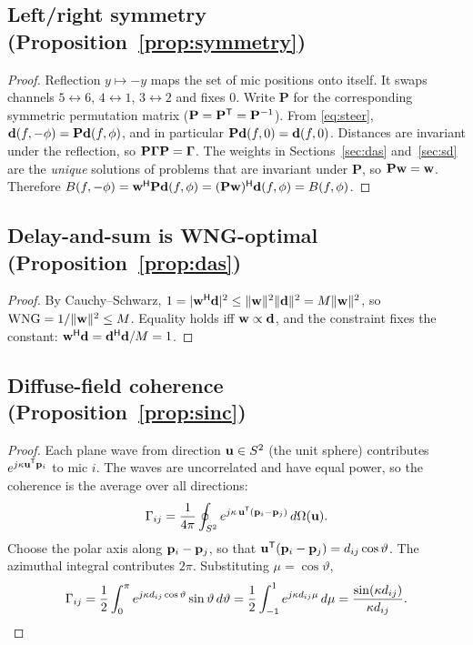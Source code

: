\documentclass[11pt]{article}
\begin{document}
\subsection{Left/right symmetry (Proposition~\ref{prop:symmetry})}\label{prf:symmetry}
\begin{proof}
Reflection $y\mapsto -y$ maps the set of mic positions onto itself. It swaps channels
$5\leftrightarrow6$, $4\leftrightarrow1$, $3\leftrightarrow2$ and fixes $0$. Write $\mathbf P$
for the corresponding symmetric permutation matrix ($\mathbf P=\mathbf P^{\mathsf T}=\mathbf P^{-1}$).
From \eqref{eq:steer}, $\mathbf{d}(f,-\phi)=\mathbf P\mathbf{d}(f,\phi)$, and in particular
$\mathbf P\mathbf{d}(f,0)=\mathbf{d}(f,0)$. Distances are invariant under the reflection, so
$\mathbf P\bm{\Gamma}\mathbf P=\bm{\Gamma}$. The weights in Sections~\ref{sec:das} and~\ref{sec:sd} are the
\emph{unique} solutions of problems that are invariant under $\mathbf P$, so $\mathbf P\mathbf{w}=\mathbf{w}$.
Therefore $B(f,-\phi)=\mathbf{w}^{\mathsf H}\mathbf P\mathbf{d}(f,\phi)=(\mathbf P\mathbf{w})^{\mathsf H}\mathbf{d}(f,\phi)=B(f,\phi)$.
\end{proof}

\subsection{Delay-and-sum is WNG-optimal (Proposition~\ref{prop:das})}\label{prf:das}
\begin{proof}
By Cauchy--Schwarz, $1=|\mathbf{w}^{\mathsf H}\mathbf{d}|^2\le\|\mathbf{w}\|^2\|\mathbf{d}\|^2=M\|\mathbf{w}\|^2$, so
$\mathrm{WNG}=1/\|\mathbf{w}\|^2\le M$. Equality holds iff $\mathbf{w}\propto\mathbf{d}$, and the constraint fixes the
constant: $\mathbf{w}^{\mathsf H}\mathbf{d}=\mathbf{d}^{\mathsf H}\mathbf{d}/M=1$.
\end{proof}

\subsection{Diffuse-field coherence (Proposition~\ref{prop:sinc})}\label{prf:sinc}
\begin{proof}
Each plane wave from direction $\mathbf{u}\in S^2$ (the unit sphere) contributes $e^{j\kappa\mathbf{u}^{\mathsf T}\mathbf{p}_i}$
to mic $i$. The waves are uncorrelated and have equal power, so the coherence is the average over
all directions:
\[
  \Gamma_{ij}=\frac{1}{4\pi}\oint_{S^2}e^{j\kappa\,\mathbf{u}^{\mathsf T}(\mathbf{p}_i-\mathbf{p}_j)}\,d\Omega(\mathbf{u}).
\]
Choose the polar axis along $\mathbf{p}_i-\mathbf{p}_j$, so that $\mathbf{u}^{\mathsf T}(\mathbf{p}_i-\mathbf{p}_j)=d_{ij}\cos\vartheta$.
The azimuthal integral contributes $2\pi$. Substituting $\mu=\cos\vartheta$,
\[
  \Gamma_{ij}=\frac{1}{2}\int_0^{\pi}e^{j\kappa d_{ij}\cos\vartheta}\sin\vartheta\,d\vartheta
  =\frac12\int_{-1}^{1}e^{j\kappa d_{ij}\mu}\,d\mu=\frac{\sin(\kappa d_{ij})}{\kappa d_{ij}}.\qedhere
\]
\end{proof}
\end{document}
